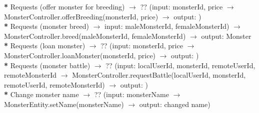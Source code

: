 \textbf{*} Requests (offer monster for breeding) \begin{math}\to\end{math} ?? (input: monsterId, price \begin{math}\to\end{math} MonsterController.offerBreeding(monsterId, price) \begin{math}\to\end{math} output: )\\

\textbf{*} Requests (monster breed) \begin{math}\to\end{math} input: maleMonsterId, femaleMonsterId) \begin{math}\to\end{math}  MonsterController.breed(maleMonsterId, femaleMonsterId) \begin{math}\to\end{math} output:  Monster\\

\textbf{*} Requests (loan monster) \begin{math}\to\end{math} ?? (input:  monsterId, price \begin{math}\to\end{math}  MonsterController.loanMonster(monsterId, price) \begin{math}\to\end{math} output: )\\

\textbf{*} Requests (monster battle) \begin{math}\to\end{math} ?? (input: localUserId, monsterId, remoteUserId, remoteMonsterId \begin{math}\to\end{math} MonsterController.requestBattle(localUserId, monsterId, remoteUserId, remoteMonsterId) \begin{math}\to\end{math} output: )\\

\textbf{*} Change monster name \begin{math}\to\end{math} ?? (input:  monsterName \begin{math}\to\end{math}  MonsterEntity.setName(monsterName) \begin{math}\to\end{math} output: changed name)\\

